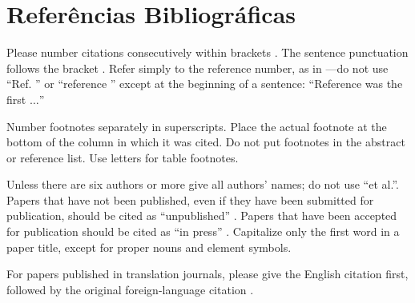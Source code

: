 \documentclass[conference]{IEEEtran}
\begin{document}
\section*{Referências Bibliográficas}

Please number citations consecutively within brackets \cite{b1}. The 
sentence punctuation follows the bracket \cite{b2}. Refer simply to the reference 
number, as in \cite{b3}---do not use ``Ref. \cite{b3}'' or ``reference \cite{b3}'' except at 
the beginning of a sentence: ``Reference \cite{b3} was the first $\ldots$''

Number footnotes separately in superscripts. Place the actual footnote at 
the bottom of the column in which it was cited. Do not put footnotes in the 
abstract or reference list. Use letters for table footnotes.

Unless there are six authors or more give all authors' names; do not use 
``et al.''. Papers that have not been published, even if they have been 
submitted for publication, should be cited as ``unpublished'' \cite{b4}. Papers 
that have been accepted for publication should be cited as ``in press'' \cite{b5}. 
Capitalize only the first word in a paper title, except for proper nouns and 
element symbols.

For papers published in translation journals, please give the English 
citation first, followed by the original foreign-language citation \cite{b6}.


\end{document}
